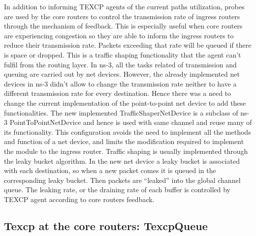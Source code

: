 In addition to informing TEXCP agents of the current paths utilization, probes are used by the core routers to control the transmission rate of ingress routers through the mechanism of feedback. This is especially useful when core routers are experiencing congestion so they are able to inform the ingress routers to reduce their transmission rate. Packets exceeding that rate will be queued if there is space or dropped. This is a traffic shaping functionality that the agent can't fulfil from the routing layer. In ns-3, all the tasks related of transmission and queuing are carried out by net devices. However, the already implemented net devices in ns-3 didn't allow to change the transmission rate neither to have a different transmission rate for every destination. Hence there was a need to change the current implementation of the point-to-point net device to add these functionalities. The new implemented TrafficShaperNetDevice is a subclass of ns-3 PointToPointNetDevice and hence is used with same channel and reuse many of its functionality. This configuration avoids the need to implement all the methods and function of a net device, and limits the modification required to implement the module to the ingress router. Traffic shaping is usually implemented through the leaky bucket algorithm. In the new net device a leaky bucket is associated with each destination, so when a new packet comes it is queued in the corresponding leaky bucket. Then packets are “leaked” into the global channel queue. The leaking rate, or the draining rate of each buffer is controlled  by TEXCP agent according to core routers feedback. 

\subsection{Texcp at the core routers: TexcpQueue}

